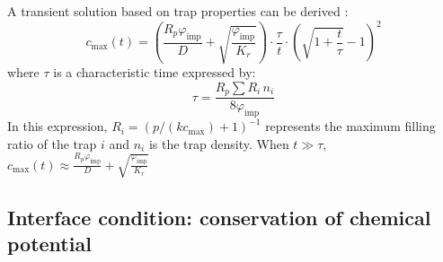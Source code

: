 A transient solution based on trap properties can be derived :
\begin{equation}
    c_\mathrm{max}(t)=\left( \frac{R_p \varphi_\mathrm{imp}}{D} + \sqrt{\frac{\varphi_\mathrm{imp}}{K_r}} \right) \cdot \frac{\tau}{t} \cdot\left(\sqrt{1+\frac{t}{\tau}}-1\right)^2
\end{equation}
where $\tau$ is a characteristic time expressed by:
\begin{equation}
    \tau = \frac{R_p \sum R_i \, n_i}{8 \varphi_\mathrm{imp}}
\end{equation}
In this expression, $R_i = (p / (k c_\mathrm{max}) + 1)^{-1}$ represents the maximum filling ratio of the trap $i$ and $n_i$ is the trap density.
When $t \gg \tau$, $c_\mathrm{max}(t) \approx \frac{R_p \varphi_\mathrm{imp}}{D} + \sqrt{\frac{\varphi_\mathrm{imp}}{K_r}}$

\subsection{Interface condition: conservation of chemical potential}



    
